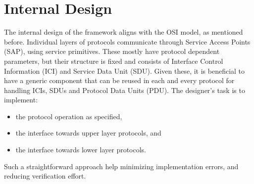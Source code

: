 \documentclass[journal]{IEEEtran}
\begin{document}
\IEEEpubidadjcol

\section{Internal Design}\label{sec:Internal Design}

The internal design of the framework aligns with the OSI model, as mentioned before. Individual layers of protocols
communicate through Service Access Points (SAP), using service primitives.
These mostly have protocol dependent parameters, but their structure is fixed and consists of Interface Control
Information (ICI)  and Service Data Unit (SDU). Given these, it is beneficial to have a generic component that can be reused
in each and every protocol for handling ICIs, SDUs and Protocol Data Units (PDU). The designer's task is to implement:
\begin{itemize}
    \renewcommand \labelitemi{--}
    \item the protocol operation as specified,
    \item the interface towards upper layer protocols, and
    \item the interface towards lower layer protocols.
\end{itemize}

Such a straightforward approach help minimizing implementation errors, and reducing verification effort.
\end{document}
